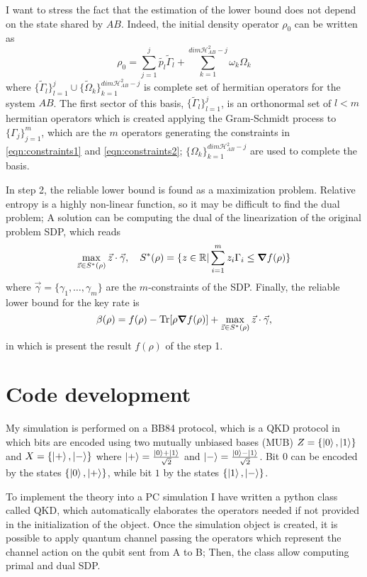 \documentclass{article}
\begin{document}
    I want to stress the fact that the estimation of the lower bound does not depend on the state shared by \(AB\).
    Indeed, the initial density operator \(\rho_0\) can be written as
    \[\rho_0 = \sum_{j=1}^j\tilde{p_l}\tilde{\Gamma}_l + \sum_{k=1}^{dim \mathcal{H}_{AB}^2-j}\omega_k\Omega_k\]
    where \(\{\tilde{\Gamma}_l\}_{l=1}^j\cup \{\tilde{\Omega}_k\}_{k=1}^{dim \mathcal{H}_{AB}^2-j}\)
    is complete set of hermitian operators for the system \(AB\).
    The first sector of this basis, \(\{\tilde{\Gamma}_l\}_{l=1}^j\), is an orthonormal set of \(l<m\) hermitian operators which is created applying the Gram-Schmidt process to \(\{\Gamma_j\}_{j=1}^{m}\), which are the \(m\) operators generating the constraints in \eqref{eqn:constraints1} and \eqref{eqn:constraints2};
    \(\{\Omega_k\}_{k=1}^{dim \mathcal{H}_{AB}^2-j}\) are used to complete the basis.

    In step 2, the reliable lower bound is found as a maximization problem.
    Relative entropy is a highly non-linear function, so it may be difficult to find the dual problem;
    A solution can be computing the dual of the linearization of the original problem SDP, which reads
    \[\max_{\vec{z}\in S^*(\rho)}\vec{z}\cdot\vec{\gamma}, \quad S^*(\rho)=\{z\in \mathbb{R}|\sum_{i=1}^mz_i\Gamma_i\leq \grad f(\rho) \} \]
    where \(\vec{\gamma}=\{\gamma_1,\ldots,\gamma_m\}\) are the \(m\)-constraints of the SDP.
    Finally, the reliable lower bound for the key rate is 
    \[\beta(\rho)=f(\rho) - \Tr[\rho \grad f(\rho)] + \max_{\vec{z}\in S^*(\rho)}\vec{z}\cdot\vec{\gamma},\]
    in which is present the result \(f(\rho)\) of the step 1.

\section{Code development}
    My simulation is performed on a BB84 protocol, which is a QKD protocol in which bits are encoded using two mutually unbiased bases (MUB) \(Z=\{\ket{0}, \ket{1}\}\) and \(X=\{\ket{+},\ket{-}\}\) where \(\ket{+}=\frac{\ket{0}+\ket{1}}{\sqrt{2}}\) and \(\ket{-}=\frac{\ket{0}-\ket{1}}{\sqrt{2}}\).
    Bit \( 0 \) can be encoded by the states \( \{ \ket{0}, \ket{+} \} \), while bit \(1\) by the states \( \{ \ket{1}, \ket{-} \} \).

    To implement the theory into a PC simulation I have written a python class called \textrm{QKD}, which automatically elaborates the operators needed if not provided in the initialization of the object.
    Once the simulation object is created, it is possible to apply quantum channel passing the operators which represent the channel action on the qubit sent from A to B;
    Then, the class allow computing primal and dual SDP.
\end{document}
